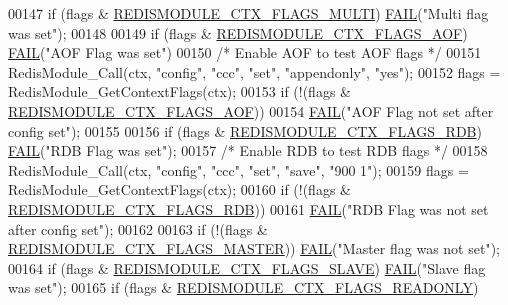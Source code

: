 \begin{DoxyCode}
{00147     \textcolor{keywordflow}{if} (flags & \hyperlink{redismodule_8h_a2498b6bcdcdc1733a2913a23d23c2b56}{REDISMODULE\_CTX\_FLAGS\_MULTI}) 
      \hyperlink{testmodule_8c_a292ad803e75cf5ca00676b8595513ace}{FAIL}(\textcolor{stringliteral}{"Multi flag was set"});
00148 
00149     \textcolor{keywordflow}{if} (flags & \hyperlink{redismodule_8h_a33ce10fefe981f7c6f3676b8d6ed6195}{REDISMODULE\_CTX\_FLAGS\_AOF}) \hyperlink{testmodule_8c_a292ad803e75cf5ca00676b8595513ace}{FAIL}(\textcolor{stringliteral}{"AOF Flag was set"})
00150     \textcolor{comment}{/* Enable AOF to test AOF flags */}
00151     RedisModule\_Call(ctx, \textcolor{stringliteral}{"config"}, \textcolor{stringliteral}{"ccc"}, \textcolor{stringliteral}{"set"}, \textcolor{stringliteral}{"appendonly"}, \textcolor{stringliteral}{"yes"});
00152     flags = RedisModule\_GetContextFlags(ctx);
00153     \textcolor{keywordflow}{if} (!(flags & \hyperlink{redismodule_8h_a33ce10fefe981f7c6f3676b8d6ed6195}{REDISMODULE\_CTX\_FLAGS\_AOF}))
00154       \hyperlink{testmodule_8c_a292ad803e75cf5ca00676b8595513ace}{FAIL}(\textcolor{stringliteral}{"AOF Flag not set after config set"});
00155 
00156     \textcolor{keywordflow}{if} (flags & \hyperlink{redismodule_8h_a27a5c58d9cbaba98c06c532d09dc7a41}{REDISMODULE\_CTX\_FLAGS\_RDB}) \hyperlink{testmodule_8c_a292ad803e75cf5ca00676b8595513ace}{FAIL}(\textcolor{stringliteral}{"RDB Flag was set"});
00157     \textcolor{comment}{/* Enable RDB to test RDB flags */}
00158     RedisModule\_Call(ctx, \textcolor{stringliteral}{"config"}, \textcolor{stringliteral}{"ccc"}, \textcolor{stringliteral}{"set"}, \textcolor{stringliteral}{"save"}, \textcolor{stringliteral}{"900 1"});
00159     flags = RedisModule\_GetContextFlags(ctx);
00160     \textcolor{keywordflow}{if} (!(flags & \hyperlink{redismodule_8h_a27a5c58d9cbaba98c06c532d09dc7a41}{REDISMODULE\_CTX\_FLAGS\_RDB}))
00161       \hyperlink{testmodule_8c_a292ad803e75cf5ca00676b8595513ace}{FAIL}(\textcolor{stringliteral}{"RDB Flag was not set after config set"});
00162 
00163     \textcolor{keywordflow}{if} (!(flags & \hyperlink{redismodule_8h_a4ada8d595eeaaea1d343cafaab7be85a}{REDISMODULE\_CTX\_FLAGS\_MASTER})) 
      \hyperlink{testmodule_8c_a292ad803e75cf5ca00676b8595513ace}{FAIL}(\textcolor{stringliteral}{"Master flag was not set"});
00164     \textcolor{keywordflow}{if} (flags & \hyperlink{redismodule_8h_ae6c2d2900511d92be4f9ecab6a330459}{REDISMODULE\_CTX\_FLAGS\_SLAVE}) 
      \hyperlink{testmodule_8c_a292ad803e75cf5ca00676b8595513ace}{FAIL}(\textcolor{stringliteral}{"Slave flag was set"});
00165     \textcolor{keywordflow}{if} (flags & \hyperlink{redismodule_8h_a58e4767512e8e1491f048cb77ac9371f}{REDISMODULE\_CTX\_FLAGS\_READONLY}) 
}
\end{DoxyCode}
